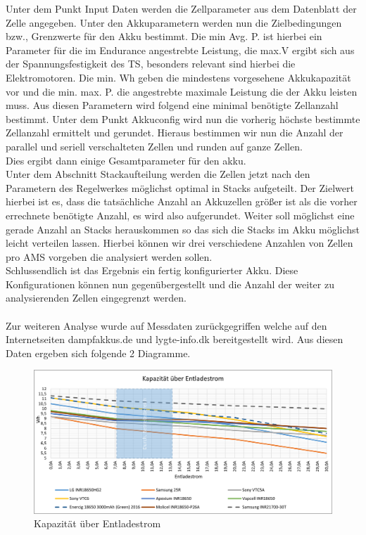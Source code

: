 Unter dem Punkt Input Daten werden die Zellparameter aus dem Datenblatt der Zelle angegeben. Unter den Akkuparametern werden nun die Zielbedingungen bzw., Grenzwerte für den Akku bestimmt. Die min Avg. P. ist hierbei ein Parameter für die im Endurance angestrebte Leistung, die max.V ergibt sich aus der Spannungsfestigkeit des \ac{TS}, besonders relevant sind hierbei die Elektromotoren. Die min. Wh geben die mindestens vorgesehene Akkukapazität vor und die min. max. P. die angestrebte maximale Leistung die der Akku leisten muss. Aus diesen Parametern wird folgend eine minimal benötigte Zellanzahl bestimmt. Unter dem Punkt Akkuconfig wird nun die vorherig höchste bestimmte Zellanzahl ermittelt und gerundet. Hieraus bestimmen wir nun die Anzahl der parallel und seriell verschalteten Zellen und runden auf ganze Zellen.\\
Dies ergibt dann einige Gesamtparameter für den akku.\\
Unter dem Abschnitt Stackaufteilung werden die Zellen jetzt nach den Parametern des Regelwerkes möglichst optimal in Stacks aufgeteilt. Der Zielwert hierbei ist es, dass die tatsächliche Anzahl an Akkuzellen größer ist als die vorher errechnete benötigte Anzahl, es wird also aufgerundet. Weiter soll möglichst eine gerade Anzahl an Stacks herauskommen so das sich die Stacks im Akku möglichst leicht verteilen lassen. Hierbei können wir drei verschiedene Anzahlen von Zellen pro \ac{AMS} vorgeben die analysiert werden sollen.\\
Schlussendlich ist das Ergebnis ein fertig konfigurierter Akku. Diese Konfigurationen können nun gegenübergestellt und die Anzahl der weiter zu analysierenden Zellen eingegrenzt werden.\\
\\
Zur weiteren Analyse wurde auf Messdaten zurückgegriffen welche auf den Internetseiten dampfakkus.de und lygte-info.dk bereitgestellt wird. Aus diesen Daten ergeben sich folgende 2 Diagramme.

\begin{figure}[h]
	\centering
	\includegraphics[width=0.6\linewidth]{bilder/Kapazitaet_ueber_Entladestrom}
	\caption{Kapazität über Entladestrom}
	\label{fig:Kapazitaet_ueber_Entladestrom}
\end{figure}

